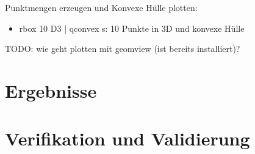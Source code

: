 \documentclass[12pt]{scrartcl}
\begin{document}
Punktmengen erzeugen und Konvexe Hülle plotten:
\begin{itemize}
    \item rbox 10 D3 | qconvex s: 10 Punkte in 3D und konvexe Hülle
\end{itemize}


TODO:
 wie geht plotten mit geomview (ist bereits installiert)?

\newpage

\section{Ergebnisse}


\section{Verifikation und Validierung}



\end{document}
